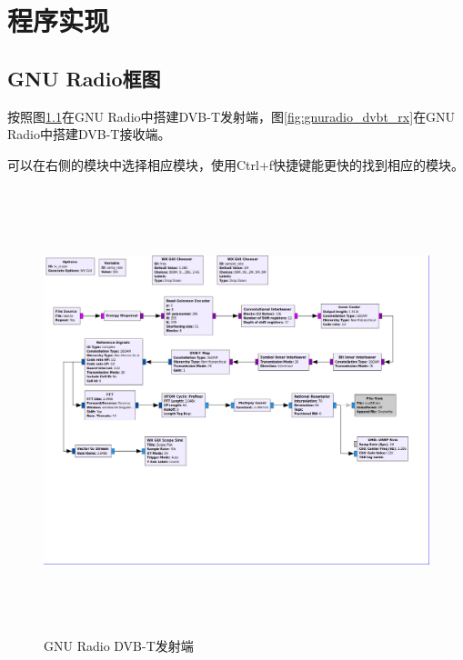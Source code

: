 \chapter{程序实现}
	\section{GNU Radio框图}
		\par 按照图\ref{fig:gnuradio_dvbt_tx}在GNU Radio中搭建DVB-T发射端，图\ref{fig:gnuradio_dvbt_rx}在GNU Radio中搭建DVB-T接收端。
		\par 可以在右侧的模块中选择相应模块，使用Ctrl+f快捷键能更快的找到相应的模块。
		\begin{figure}[htb]
			\centering
			\includegraphics[height=13cm,angle=-90]{figures/dvbt_tx.png}
			\caption{GNU Radio DVB-T发射端}
			\label{fig:gnuradio_dvbt_tx}
		\end{figure}
